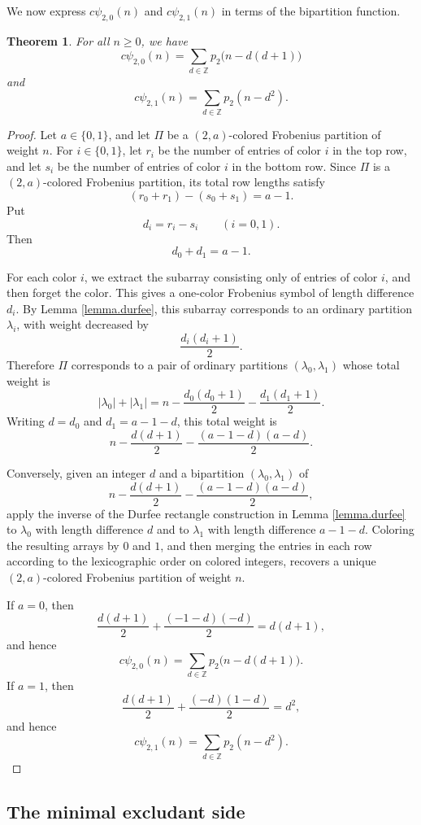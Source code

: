 \documentclass[12pt]{amsart}
\newtheorem{theorem}{Theorem}[section]
\theoremstyle{definition}
\theoremstyle{remark}
\numberwithin{equation}{section}
\newcommand{\cpsi}{c\psi}
\begin{document}
We now express $\cpsi_{2,0}(n)$ and $\cpsi_{2,1}(n)$ in terms of the bipartition function.

\begin{theorem}\label{thm.cpsi.p2}
For all $n\geq 0$, we have
\[
\cpsi_{2,0}(n)=\sum_{d\in\mathbb Z}p_2\bigl(n-d(d+1)\bigr)
\]
and
\[
\cpsi_{2,1}(n)=\sum_{d\in\mathbb Z}p_2(n-d^2).
\]
\end{theorem}

\begin{proof}
Let $a\in\{0,1\}$, and let $\Pi$ be a $(2,a)$-colored Frobenius partition of weight $n$.  For $i\in\{0,1\}$, let $r_i$ be the number of entries of color $i$ in the top row, and let $s_i$ be the number of entries of color $i$ in the bottom row.  Since $\Pi$ is a $(2,a)$-colored Frobenius partition, its total row lengths satisfy
\[
(r_0+r_1)-(s_0+s_1)=a-1.
\]
Put
\[
d_i=r_i-s_i\qquad(i=0,1).
\]
Then
\[
d_0+d_1=a-1.
\]

For each color $i$, we extract the subarray consisting only of entries of color $i$, and then forget the color.  This gives a one-color Frobenius symbol of length difference $d_i$.  By Lemma \ref{lemma.durfee}, this subarray corresponds to an ordinary partition $\lambda_i$, with weight decreased by
\[
\frac{d_i(d_i+1)}2.
\]
Therefore $\Pi$ corresponds to a pair of ordinary partitions $(\lambda_0,\lambda_1)$ whose total weight is
\[
|\lambda_0|+|\lambda_1|
=
 n-\frac{d_0(d_0+1)}2-\frac{d_1(d_1+1)}2.
\]
Writing $d=d_0$ and $d_1=a-1-d$, this total weight is
\[
n-\frac{d(d+1)}2-\frac{(a-1-d)(a-d)}2.
\]

Conversely, given an integer $d$ and a bipartition $(\lambda_0,\lambda_1)$ of
\[
n-\frac{d(d+1)}2-\frac{(a-1-d)(a-d)}2,
\]
apply the inverse of the Durfee rectangle construction in Lemma \ref{lemma.durfee} to $\lambda_0$ with length difference $d$ and to $\lambda_1$ with length difference $a-1-d$.  Coloring the resulting arrays by $0$ and $1$, and then merging the entries in each row according to the lexicographic order on colored integers, recovers a unique $(2,a)$-colored Frobenius partition of weight $n$.

If $a=0$, then
\[
\frac{d(d+1)}2+\frac{(-1-d)(-d)}2=d(d+1),
\]
and hence
\[
\cpsi_{2,0}(n)=\sum_{d\in\mathbb Z}p_2\bigl(n-d(d+1)\bigr).
\]
If $a=1$, then
\[
\frac{d(d+1)}2+\frac{(-d)(1-d)}2=d^2,
\]
and hence
\[
\cpsi_{2,1}(n)=\sum_{d\in\mathbb Z}p_2(n-d^2).
\]
\end{proof}

\subsection{The minimal excludant side}
\end{document}
